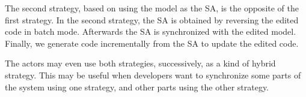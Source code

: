 The second strategy, based on using the model as the SA,
is the opposite of the first strategy. 
In the second strategy, the SA is
obtained by reversing the edited code in batch mode.
Afterwards the SA is synchronized with the edited model.
Finally, we generate code incrementally from the SA to update the edited code.

%
%

The actors may even use both strategies, successively, as a kind of hybrid strategy.
This may be useful
when developers want to synchronize some parts of the system using one strategy,
and other parts using the other strategy. %


